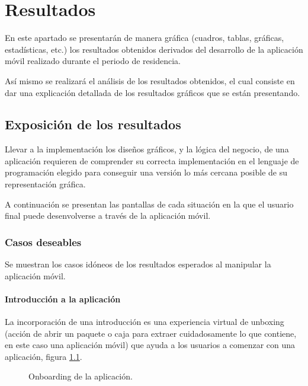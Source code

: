 \chapter{Resultados}

En este apartado se presentarán de manera gráfica (cuadros, tablas, gráficas, estadísticas, etc.) los resultados obtenidos derivados del desarrollo de la aplicación móvil realizado durante el periodo de residencia.

Así mismo se realizará el análisis de los resultados obtenidos, el cual consiste en dar una explicación detallada de los resultados gráficos que se están presentando.

\section{Exposición de los resultados}
\label{seccion:exposicion_resultados}

Llevar a la implementación los diseños gráficos, y la lógica del negocio, de una aplicación requieren de comprender su correcta implementación en el lenguaje de programación elegido para conseguir una versión lo más cercana posible de su representación gráfica.

A continuación se presentan las pantallas de cada situación en la que el usuario final puede desenvolverse a través de la aplicación móvil.

\subsection{Casos deseables}
Se muestran los casos idóneos de los resultados esperados al manipular la aplicación móvil.

\subsubsection{Introducción a la aplicación}
La incorporación de una introducción es una experiencia virtual de unboxing (acción de abrir un paquete o caja para extraer cuidadosamente lo que contiene, en este caso una aplicación móvil) que ayuda a los usuarios a comenzar con una aplicación, figura \ref{onboarding}.

\begin{figure}[!h]
	\centering
	\caption{Onboarding de la aplicación.}
	\label{onboarding}
\end{figure}

